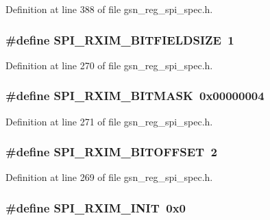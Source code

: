 Definition at line 388 of file gsn\_\-reg\_\-spi\_\-spec.h.

\hypertarget{a00573_a0d0458bc756d44abf421f862a30dfbc0}{
\subsubsection[{SPI\_\-RXIM\_\-BITFIELDSIZE}]{\setlength{\rightskip}{0pt plus 5cm}\#define SPI\_\-RXIM\_\-BITFIELDSIZE~1}}
\label{a00573_a0d0458bc756d44abf421f862a30dfbc0}


Definition at line 270 of file gsn\_\-reg\_\-spi\_\-spec.h.

\hypertarget{a00573_abf50f598d6e33ead7b7cdfdb129126c6}{
\subsubsection[{SPI\_\-RXIM\_\-BITMASK}]{\setlength{\rightskip}{0pt plus 5cm}\#define SPI\_\-RXIM\_\-BITMASK~0x00000004}}
\label{a00573_abf50f598d6e33ead7b7cdfdb129126c6}


Definition at line 271 of file gsn\_\-reg\_\-spi\_\-spec.h.

\hypertarget{a00573_a2438f86c5b0aae511656af7fe0954d09}{
\subsubsection[{SPI\_\-RXIM\_\-BITOFFSET}]{\setlength{\rightskip}{0pt plus 5cm}\#define SPI\_\-RXIM\_\-BITOFFSET~2}}
\label{a00573_a2438f86c5b0aae511656af7fe0954d09}


Definition at line 269 of file gsn\_\-reg\_\-spi\_\-spec.h.

\hypertarget{a00573_af1dfc6d82796f4c6362c43c744463fb3}{
\subsubsection[{SPI\_\-RXIM\_\-INIT}]{\setlength{\rightskip}{0pt plus 5cm}\#define SPI\_\-RXIM\_\-INIT~0x0}}
\label{a00573_af1dfc6d82796f4c6362c43c744463fb3}



